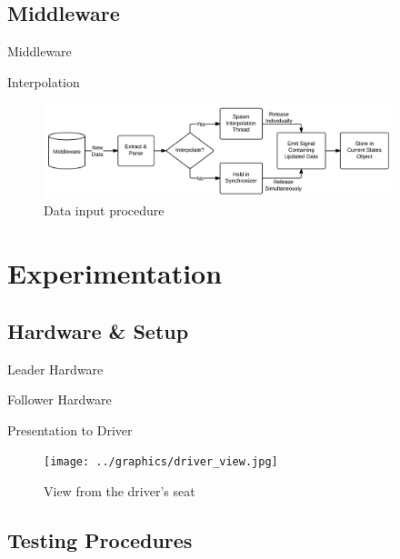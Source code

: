 \documentclass{beamer}
\begin{document}
  \subsection{Middleware}

    \begin{frame}{Middleware}
    \end{frame}

    \begin{frame}{Interpolation}
      \begin{figure}[ht] \centering
        \includegraphics[width=4in] {../graphics/middleware_diagram.png}
        \caption{Data input procedure} \label{fig:mw_diagram}
      \end{figure}
    \end{frame}

\section{Experimentation}

  \subsection{Hardware \& Setup}

    \begin{frame}{Leader Hardware}
    \end{frame}

    \begin{frame}{Follower Hardware}
    \end{frame}

    \begin{frame}{Presentation to Driver}
      \begin{figure}[ht] \centering
        \texttt{[image: ../graphics/driver\_view.jpg]}
        \caption{View from the driver's seat} \label{fig:driver_view}
      \end{figure}
    \end{frame}

  \subsection{Testing Procedures}
\end{document}
